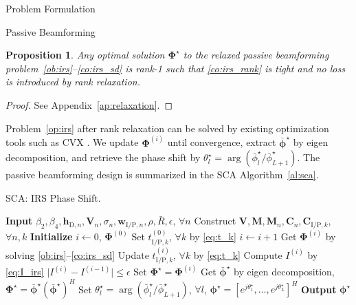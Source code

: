 \documentclass[journal]{IEEEtran}
\newtheorem{proposition}{Proposition}
\begin{document}
\begin{section}{Problem Formulation}
\begin{subsection}{Passive Beamforming}
			\begin{proposition}\label{pr:relaxation}
				Any optimal solution $\boldsymbol{\Phi}^\star$ to the relaxed passive beamforming problem~\eqref{ob:irs}--\eqref{co:irs_sd} is rank-\num{1} such that \eqref{co:irs_rank} is tight and no loss is introduced by rank relaxation.
			\end{proposition}

			\begin{proof}\label{pf:relaxation}
				See Appendix~\ref{ap:relaxation}.
			\end{proof}

			Problem~\eqref{op:irs} after rank relaxation can be solved by existing optimization tools such as CVX \cite{Grant2008}. We update $\boldsymbol{\Phi}^{(i)}$ until convergence, extract $\bar{\boldsymbol{\phi}}^\star$ by eigen decomposition, and retrieve the phase shift by $\theta_l^{\star}=\arg(\bar{\phi}_l^\star/\bar{\phi}_{L+1}^\star)$. The passive beamforming design is summarized in the SCA Algorithm~\ref{al:sca}.
			\begin{algorithm}[!t]
				\caption{SCA: IRS Phase Shift.}
				\label{al:sca}
				\begin{algorithmic}[1]
					\State \textbf{Input} $\beta_2,\beta_4,\boldsymbol{h}_{\mathrm{D},n},\boldsymbol{V}_{n},\sigma_n,\boldsymbol{w}_{\mathrm{I/P},n},\rho,\bar{R},\epsilon$, $\forall n$
					\State Construct $\boldsymbol{V},\boldsymbol{M},\boldsymbol{M}_n,\boldsymbol{C}_{n},\boldsymbol{C}_{\mathrm{I/P},k}$, $\forall n,k$
					\State \textbf{Initialize} $i \gets 0$, $\boldsymbol{\Phi}^{(0)}$
					\State Set $t_{\mathrm{I/P},k}^{(0)}$, $\forall k$ by \eqref{eq:t_k}
					\Repeat
						\State $i \gets i + 1$
						\State Get $\boldsymbol{\Phi}^{(i)}$ by solving \eqref{ob:irs}--\eqref{co:irs_sd}
						\State Update $t_{\mathrm{I/P},k}^{(i)}$, $\forall k$ by \eqref{eq:t_k}
						\State Compute $I^{(i)}$ by \eqref{eq:I_irs}
					\Until $\lvert I^{(i)}-I^{(i-1)} \rvert \le \epsilon$
					\State Set $\boldsymbol{\Phi}^{\star}=\boldsymbol{\Phi}^{(i)}$
					\State Get $\bar{\boldsymbol{\phi}}^\star$ by eigen decomposition, $\boldsymbol{\Phi}^{\star}=\bar{\boldsymbol{\phi}}^\star(\bar{\boldsymbol{\phi}}^\star)^H$
					\State Set $\theta_l^\star=\arg(\bar{\phi}_l^\star/\bar{\phi}_{L+1}^\star)$, $\forall l$, $\boldsymbol{\phi}^{\star}=[e^{j\theta_1^\star},\dots,e^{j\theta_L^\star}]^H$
					\State \textbf{Output} $\boldsymbol{\phi}^{\star}$
				\end{algorithmic}
			\end{algorithm}


\end{subsection}
\end{section}
\end{document}
